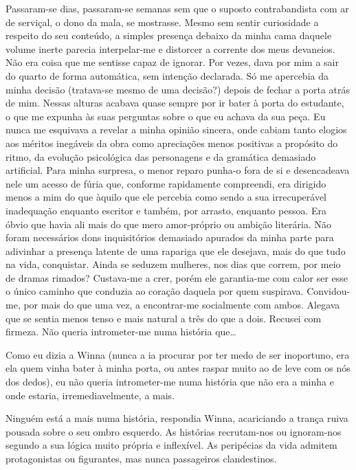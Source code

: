 Passaram-se dias, passaram-se semanas sem que o suposto contrabandista
com ar de serviçal, o dono da mala, se mostrasse. Mesmo sem sentir
curiosidade a respeito do seu conteúdo, a simples presença debaixo da
minha cama daquele volume inerte parecia interpelar-me e distorcer a
corrente dos meus devaneios. Não era coisa que me sentisse capaz de
ignorar. Por vezes, dava por mim a sair do quarto de forma automática,
sem intenção declarada. Só me apercebia da minha decisão (tratava-se
mesmo de uma decisão?) depois de fechar a porta atrás de mim. Nessas
alturas acabava quase sempre por ir bater à porta do estudante, o que me
expunha às suas perguntas sobre o que eu achava da sua peça. Eu nunca me
esquivava a revelar a minha opinião sincera, onde cabiam tanto elogios
aos méritos inegáveis da obra como apreciações menos positivas a
propósito do ritmo, da evolução psicológica das personagens e da
gramática demasiado artificial. Para minha surpresa, o menor reparo
punha-o fora de si e desencadeava nele um acesso de fúria que,
conforme rapidamente compreendi, era dirigido menos a mim do que àquilo
que ele percebia como sendo a sua irrecuperável inadequação enquanto
escritor e também, por arrasto, enquanto pessoa. Era óbvio que havia ali
mais do que mero amor-próprio ou ambição literária. Não foram
necessários dons inquisitórios demasiado apurados da minha parte para
adivinhar a presença latente de uma rapariga que ele desejava, mais do
que tudo
na vida, conquistar. Ainda se seduzem mulheres, nos dias que correm, por
meio de dramas rimados? Custava-me a crer, porém ele garantia-me com
calor ser esse o único caminho que conduzia ao coração daquela por quem
suspirava. Convidou-me, por mais do que uma vez, a encontrar-me socialmente com ambos.
Alegava que se sentia menos tenso e mais natural a três do que a dois.
Recusei com firmeza. Não queria intrometer-me numa história
que\ldots{}

Como eu dizia a Winna (nunca a ia procurar por ter medo de ser
inoportuno, era ela quem vinha bater à minha porta, ou antes raspar
muito ao de leve com os nós dos dedos), eu não queria intrometer-me numa
história que não era a minha e onde estaria, irremediavelmente, a mais.

Ninguém está a mais numa história, respondia Winna, acariciando a trança
ruiva pousada sobre o seu ombro esquerdo. As histórias recrutam-nos ou
ignoram-nos segundo a sua lógica muito própria e inflexível. As
peripécias da vida admitem protagonistas ou figurantes, mas nunca
passageiros clandestinos.

